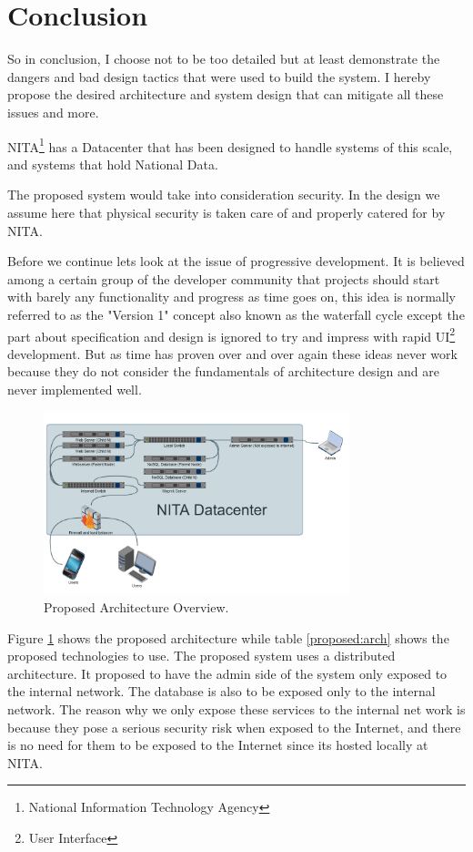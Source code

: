 \documentclass[conference,compsoc]{IEEEtran}
\begin{document}
\section{Conclusion}
So in conclusion, I choose not to be too detailed but at least demonstrate the dangers and bad design tactics that were used to build the system. I hereby propose the desired architecture and system design that can mitigate all these issues and more. \newline

NITA\footnote{National Information Technology Agency} \cite{nita:aboutus} has a Datacenter that has been designed to handle systems of this scale, and systems that hold National Data.

The proposed system would take into consideration security. In the design we assume here that physical security is taken care of and properly catered for by NITA.

Before we continue lets look at the issue of progressive development. It is believed among a certain group of the developer community
that projects should start with barely any functionality and progress as time goes on, this idea is normally referred to as the "Version 1" concept also known as the waterfall cycle except the part about specification and design is ignored to try and impress with rapid UI\footnote{User Interface} development. But as time has proven over and over again these ideas never work because
they do not consider the fundamentals of architecture design and are never implemented well.
\newline

\begin{figure}
	\includegraphics[width=3.5in]{proposed_arch_overview}
	\caption{Proposed Architecture Overview.}
	\label{fig:arch_proposed}
\end{figure}


Figure \ref{fig:arch_proposed} shows the proposed architecture while table \ref{proposed:arch} shows the proposed technologies to use. The proposed system uses a distributed architecture.
It proposed to have the admin side of the system only exposed to the internal network. The database is also to be
exposed only to the internal network. The reason why we only expose these services to the internal net work is
because they pose a serious security risk when exposed to the Internet, and there is no need for them to be
exposed to the Internet since its hosted locally at NITA.
\newline
\end{document}
